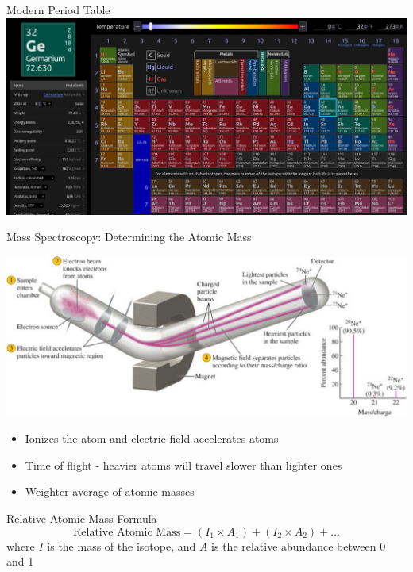 \documentclass[11pt]{beamer}
\begin{document}
\begin{frame}{Modern Period Table}
  \centering
  \includegraphics[width=\linewidth]{ptable}
\end{frame}

\begin{frame}{Mass Spectroscopy: Determining the Atomic Mass}
  \begin{center}
    \includegraphics[width=\linewidth]{mass_spect}
  \end{center}

  \begin{itemize}
  \item Ionizes the atom and electric field accelerates atoms
  \item Time of flight - heavier atoms will travel slower
    than lighter ones
  \item Weighter average of atomic masses
  \end{itemize}
\end{frame}

\begin{frame}{Relative Atomic Mass Formula}
  \begin{equation}
    \text{Relative Atomic Mass} = (I_1\times A_1) + (I_2\times A_2) + \dots
  \end{equation}
  where $I$ is the mass of the isotope, and $A$ is the
  relative abundance between 0 and 1
\end{frame}
\end{document}
